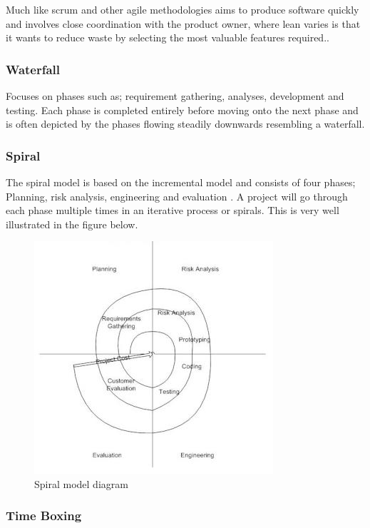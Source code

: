 Much like scrum and other agile methodologies aims to produce software
quickly and involves close coordination with the product owner, where
lean varies is that it wants to reduce waste by selecting the most
valuable features required.\parencite{agilemethods}.

\subsubsection{Waterfall}\label{waterfall}

Focuses on phases such as; requirement gathering, analyses, development
and testing. Each phase is completed entirely before moving onto the
next phase and is often depicted by the phases flowing steadily
downwards resembling a waterfall.

\subsubsection{Spiral}\label{spiral}

The spiral model is based on the incremental model and consists of four
phases; Planning, risk analysis, engineering and evaluation
\parencite{spiral}. A project will go through each phase multiple times
in an iterative process or spirals. This is very well illustrated in the
figure below.

\begin{figure}
\centering
\includegraphics{../../Images/Spiral-model.jpg}
\caption{Spiral model diagram \parencite{spiral}}
\end{figure}

\subsubsection{Time Boxing}\label{time-boxing}

